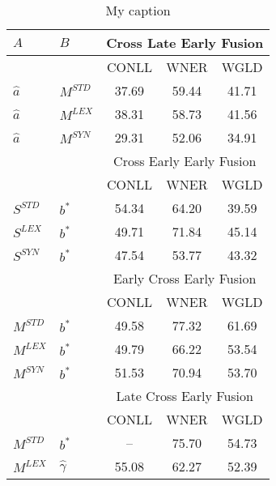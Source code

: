 \begin{table}[]
\centering
\begin{tabular}{@{}llccc@{}}
	\toprule
	$A$                      & $B$            & \multicolumn{3}{c}{Cross Late Early Fusion}  \\ \midrule
	                         &                & CONLL & WNER  &             WGLD             \\
	\cmidrule{3-5}
$\hat{a}$ & $M^{STD}$      & 37.69 & 59.44 &            41.71             \\
	$\hat{a}$                & $M^{LEX}$      & 38.31 & 58.73 &            41.56             \\
	$\hat{a}$                & $M^{SYN}$      & 29.31 & 52.06 &            34.91             \\ \midrule
	                         &                & \multicolumn{3}{c}{Cross Early Early Fusion} \\ \midrule
	                         &                & CONLL & WNER  &             WGLD             \\
	\cmidrule{3-5}
$S^{STD}$ & $b^*$          &   54.34    &    64.20   & 39.59 \\
	$S^{LEX}$                & $b^*$          &  49.71     &   71.84    &  45.14\\
	$S^{SYN}$                & $b^*$          &  47.54     &   53.77    & 43.32 \\ \midrule
	                         &                & \multicolumn{3}{c}{Early Cross Early Fusion} \\ \midrule
	                         &                & CONLL & WNER  &             WGLD             \\
	\cmidrule{3-5}
$M^{STD}$ & $b^*$          & 49.58 & 77.32 &            61.69             \\
	$M^{LEX}$                & $b^*$          & 49.79 & 66.22 &            53.54             \\
	$M^{SYN}$                & $b^*$          & 51.53 & 70.94 &            53.70             \\ \midrule
	                         &                & \multicolumn{3}{c}{Late Cross Early Fusion}  \\ \midrule
	                         &                & CONLL & WNER  &             WGLD             \\
	\cmidrule{3-5}
$M^{STD}$ & $b^*$          &  --   & 75.70 &            54.73             \\
	$M^{LEX}$                & $\hat{\gamma}$ & 55.08 & 62.27 &            52.39             \\ \bottomrule
\end{tabular}
\caption{My caption}
\label{my-label}
\end{table}

